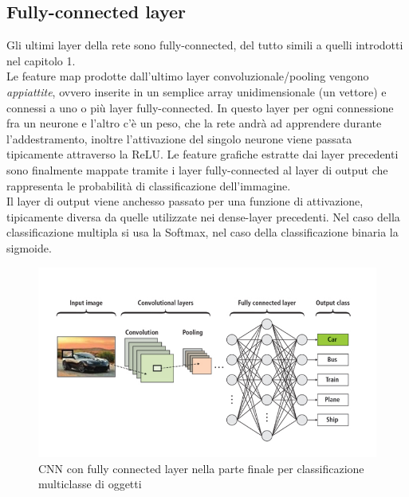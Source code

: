 \documentclass[12pt,a4paper,openright,twoside]{report}
\begin{document}
\subsection{Fully-connected layer }
Gli ultimi layer della rete sono fully-connected, del tutto simili a quelli introdotti nel capitolo 1. \\
Le feature map prodotte dall'ultimo layer convoluzionale/pooling vengono \emph{appiattite}, ovvero inserite in un semplice array unidimensionale (un vettore) e connessi a uno o più layer fully-connected. In questo layer per ogni connessione fra un neurone e l'altro c'è un peso, che la rete andrà ad apprendere durante l'addestramento, inoltre l'attivazione del singolo neurone viene passata tipicamente attraverso la ReLU. Le feature grafiche estratte dai layer precedenti sono finalmente mappate tramite i layer fully-connected al layer di output che rappresenta le probabilità di classificazione dell'immagine.
\\Il layer di output viene anchesso passato per una funzione di attivazione, tipicamente diversa da quelle utilizzate nei dense-layer precedenti. Nel caso della classificazione multipla si usa la Softmax, nel caso della classificazione binaria la sigmoide.
\begin{figure}[h]
\centering
\includegraphics[width=\linewidth]{CNN_fully_connected.png}
\caption{CNN con fully connected layer nella parte finale per classificazione multiclasse di oggetti }
\end{figure}
\end{document}
